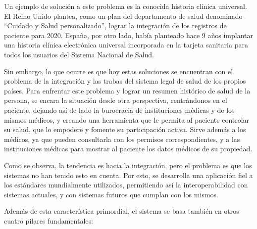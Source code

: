\documentclass[a4paper,twocolumn,12pt]{article}
\begin{document}
Un ejemplo de solución a este problema es la conocida historia clínica universal.
El Reino Unido plantea, como un plan del departamento de salud denominado ``Cuidado y Salud personalizado'', lograr la integración de los registros de paciente para 2020.
España, por otro lado, había planteado hace 9 años implantar una historia clínica electrónica universal incorporada en la tarjeta sanitaria para todos los usuarios del Sistema Nacional de Salud.

Sin embargo, lo que ocurre es que hoy estas soluciones se encuentran con el problema de la integración y las trabas del sistema legal de salud de los propios países.
Para enfrentar este problema y lograr un resumen histórico de salud de la persona, se encara la situación desde otra perspectiva, centrándonos en el paciente, dejando así de lado la burocracia de instituciones médicas y de los mismos médicos, y creando una herramienta que le permita al paciente controlar su salud, que lo empodere y fomente su participación activa.
Sirve además a los médicos, ya que pueden consultarla con los permisos correspondientes, y a las instituciones médicas para mostrar al paciente los datos médicos de su propiedad.





Como se observa, la tendencia es hacia la integración, pero el problema es que los sistemas no han tenido esto en cuenta.
Por esto, se desarrolla una aplicación fiel a los estándares mundialmente utilizados, permitiendo así la interoperabilidad con sistemas actuales, y con sistemas futuros que cumplan con los mismos.

Además de esta característica primordial, el sistema se basa también en otros cuatro pilares fundamentales:
   
\end{document}
